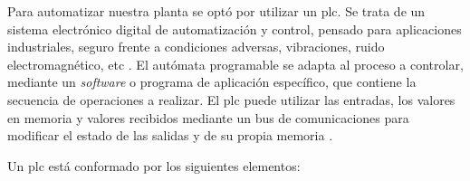 Para automatizar nuestra planta se optó por utilizar un \gls{plc}.
Se trata de un sistema electrónico digital de automatización y control, pensado 
para aplicaciones industriales, seguro frente a condiciones adversas, 
vibraciones, 
ruido electromagnético, etc \cite{bib:ApuntesJGabriel}. El autómata programable 
se adapta al proceso a controlar, mediante un \textit{software} o 
programa de aplicación específico, que contiene la secuencia de operaciones a 
realizar. 
El  \gls{plc} puede utilizar las entradas, los valores en memoria y valores 
recibidos mediante un bus de comunicaciones para modificar el estado de las 
salidas y de su propia memoria \cite{bib:libroAutomat1}.

Un \gls{plc} está conformado por los siguientes elementos:
